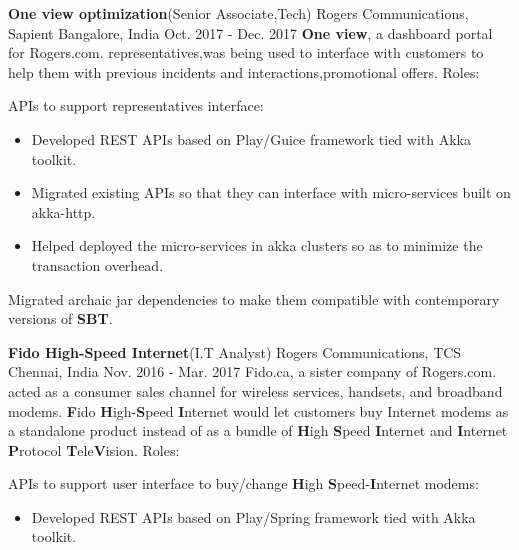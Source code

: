 \begin{cventries}
{\begin{cvitems}
             \end{cvitems}
    }
  \experienceentry
    {\textbf{One view optimization}(Senior Associate,Tech)}
    {Rogers Communications, Sapient}
    {Bangalore, India}
    {Oct. 2017 - Dec. 2017}
    {\textbf{One view}, a dashboard portal for Rogers.com. representatives,was being used to interface with customers to help them with previous incidents and interactions,promotional offers. }
    {Roles:}
    {
      \begin{cvitems}
        \item {APIs to support representatives interface:}
\begin{itemize}
\item Developed REST APIs based on Play/Guice framework tied with Akka toolkit.
\end{itemize}
\begin{itemize}
\item Migrated existing APIs so that they can interface with micro-services built on akka-http.
\end{itemize}
\begin{itemize}
\item Helped deployed the micro-services in akka clusters so as to minimize the transaction overhead. 
\end{itemize}
        \item {Migrated archaic jar dependencies to make them compatible with contemporary versions of \textbf{SBT}.}
             \end{cvitems}
    }
    \experienceentry
    {\textbf{Fido High-Speed Internet}(I.T Analyst)}
    {Rogers Communications, TCS}
    {Chennai, India}
    {Nov. 2016 - Mar. 2017}
    {Fido.ca, a sister company of Rogers.com. acted as a consumer sales channel for wireless services, handsets, and broadband modems. \textbf{F}ido \textbf{H}igh-\textbf{S}peed \textbf{I}nternet would let customers buy Internet modems as a standalone product instead of as a bundle of \textbf{H}igh \textbf{S}peed \textbf{I}nternet and \textbf{I}nternet \textbf{P}rotocol \textbf{T}ele\textbf{V}ision. }
    {Roles:}
    {
      \begin{cvitems}
        \item {APIs to support user interface to buy/change \textbf{H}igh \textbf{S}peed-\textbf{I}nternet modems:}
\begin{itemize}
\item Developed REST APIs based on Play/Spring framework tied with Akka toolkit.
\end{itemize}

\end{cvitems}}
\end{cventries}
